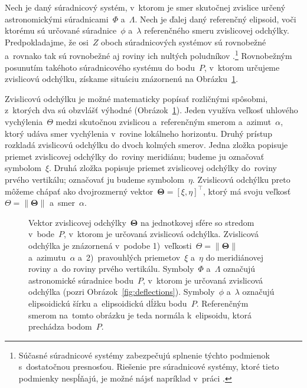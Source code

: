 \documentclass[a4paper,12pt]{book}
\begin{document}
Nech je daný súradnicový systém, v~ktorom je smer skutočnej zvislice určený 
astronomickými súradnicami~$\Phi$ a~$\Lambda$.  Nech je ďalej daný referenčný 
elipsoid, voči ktorému sú určované súradnice~$\phi$ a~$\lambda$ referenčného 
smeru zvislicovej odchýlky.  Predpokladajme, že osi~$Z$ oboch súradnicových 
systémov sú rovnobežné a~rovnako tak sú rovnobežné aj roviny ich nultých 
poludníkov \parencite{TorgeGeodesy}.\footnote{Súčasné súradnicové systémy 
zabezpečujú splnenie týchto podmienok s~dostatočnou presnosťou.  Riešenie pre 
súradnicové systémy, ktoré tieto podmienky nespĺňajú, je možné nájsť napríklad 
v~práci \textcite{Pick2000}.}  Rovnobežným posunutím takéhoto súradnicového 
systému do bodu~$P$, v~ktorom určujeme zvislicovú odchýlku, získame situáciu 
znázornenú na Obrázku~\ref{fig:deflections_unit_sphere}.

Zvislicovú odchýlku je možné matematicky popísať rozličnými spôsobmi, z~ktorých 
dva sú obzvlášť výhodné (Obrázok~\ref{fig:deflections_unit_sphere}).  Jeden 
využíva veľkosť uhlového vychýlenia~$\Theta$ medzi skutočnou zvislicou 
a~referenčným smerom a~azimut~$\alpha$, ktorý udáva smer vychýlenia v~rovine 
lokálneho horizontu.  Druhý prístup rozkladá zvislicovú odchýlku do dvoch 
kolmých smerov.  Jedna zložka popisuje priemet zvislicovej odchýlky do~roviny 
meridiánu; budeme ju označovať symbolom~$\xi$.  Druhá zložka popisuje priemet 
zvislicovej odchýlky do~roviny prvého vertikálu; označovať ju budeme 
symbolom~$\eta$.  Zvislicovú odchýlku preto môžeme chápať ako dvojrozmerný 
vektor~$\boldsymbol\Theta = [\xi, \eta]^\top$, ktorý má svoju veľkosť~$\Theta 
= \| \boldsymbol\Theta \|$ a~smer~$\alpha$.

\begin{figure}[bt]
\centering

\caption{Vektor zvislicovej odchýlky~$\boldsymbol\Theta$ na jednotkovej sfére 
so stredom v~bode~$P$, v~ktorom je určovaná zvislicová odchýlka.  Zvislicová 
odchýlka je znázornená v~podobe 1)~veľkosti~$\Theta = \| \boldsymbol\Theta \|$ 
a~azimutu~$\alpha$ a~2)~pravouhlých priemetov~$\xi$ a~$\eta$ do meridiánovej 
roviny a~do roviny prvého vertikálu.  Symboly~$\Phi$ a~$\Lambda$ označujú 
astronomické súradnice bodu~$P$, v~ktorom je určovaná zvislicová odchýlka 
(pozri Obrázok~\ref{fig:deflections}).  Symboly~$\phi$ a~$\lambda$ označujú 
elipsoidickú šírku a~elipsoidickú dĺžku bodu~$P$.  Referenčným smerom na~tomto 
obrázku je teda normála k~elipsoidu, ktorá prechádza bodom~$P$.}
\label{fig:deflections_unit_sphere}
\end{figure}
\end{document}
